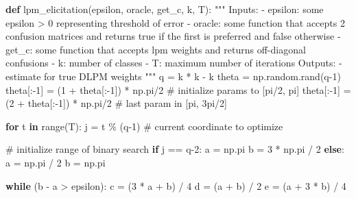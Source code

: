 \documentclass[
  letterpaper,
  numbers=noenddot,
  DIV=11,
  oneside]{scrreprt}
\newenvironment{Shaded}{\begin{snugshade}}{\end{snugshade}}
\newcommand{\BuiltInTok}[1]{\textcolor[rgb]{0.00,0.23,0.31}{#1}}
\newcommand{\CommentTok}[1]{\textcolor[rgb]{0.37,0.37,0.37}{#1}}
\newcommand{\ControlFlowTok}[1]{\textcolor[rgb]{0.00,0.23,0.31}{\textbf{#1}}}
\newcommand{\DecValTok}[1]{\textcolor[rgb]{0.68,0.00,0.00}{#1}}
\newcommand{\KeywordTok}[1]{\textcolor[rgb]{0.00,0.23,0.31}{\textbf{#1}}}
\newcommand{\NormalTok}[1]{\textcolor[rgb]{0.00,0.23,0.31}{#1}}
\newcommand{\OperatorTok}[1]{\textcolor[rgb]{0.37,0.37,0.37}{#1}}
\theoremstyle{remark}
\begin{document}
\begin{Shaded}
\begin{Highlighting}[numbers=left,,]
\KeywordTok{def}\NormalTok{ lpm\_elicitation(epsilon, oracle, get\_c, k, T):}
    \CommentTok{"""}
\CommentTok{    Inputs:}
\CommentTok{    {-} epsilon: some epsilon \textgreater{} 0 representing threshold of error}
\CommentTok{    {-} oracle: some function that accepts 2 confusion matrices and}
\CommentTok{        returns true if the first is preferred and false otherwise}
\CommentTok{    {-} get\_c: some function that accepts lpm weights and returns }
\CommentTok{        off{-}diagonal confusions}
\CommentTok{    {-} k: number of classes}
\CommentTok{    {-} T: maximum number of iterations}
\CommentTok{    Outputs:}
\CommentTok{    {-} estimate for true DLPM weights}
\CommentTok{    """}
\NormalTok{    q }\OperatorTok{=}\NormalTok{ k }\OperatorTok{*}\NormalTok{ k }\OperatorTok{{-}}\NormalTok{ k}
\NormalTok{    theta }\OperatorTok{=}\NormalTok{ np.random.rand(q}\OperatorTok{{-}}\DecValTok{1}\NormalTok{)}
\NormalTok{    theta[:}\OperatorTok{{-}}\DecValTok{1}\NormalTok{] }\OperatorTok{=}\NormalTok{ (}\DecValTok{1} \OperatorTok{+}\NormalTok{ theta[:}\OperatorTok{{-}}\DecValTok{1}\NormalTok{]) }\OperatorTok{*}\NormalTok{ np.pi}\OperatorTok{/}\DecValTok{2}  \CommentTok{\# initialize params to [pi/2, pi]}
\NormalTok{    theta[:}\OperatorTok{{-}}\DecValTok{1}\NormalTok{] }\OperatorTok{=}\NormalTok{ (}\DecValTok{2} \OperatorTok{+}\NormalTok{ theta[:}\OperatorTok{{-}}\DecValTok{1}\NormalTok{]) }\OperatorTok{*}\NormalTok{ np.pi}\OperatorTok{/}\DecValTok{2}  \CommentTok{\# last param in [pi, 3pi/2]}

    \ControlFlowTok{for}\NormalTok{ t }\KeywordTok{in} \BuiltInTok{range}\NormalTok{(T):}
\NormalTok{        j }\OperatorTok{=}\NormalTok{ t }\OperatorTok{\%}\NormalTok{ (q}\OperatorTok{{-}}\DecValTok{1}\NormalTok{)  }\CommentTok{\# current coordinate to optimize}

        \CommentTok{\# initialize range of binary search}
        \ControlFlowTok{if}\NormalTok{ j }\OperatorTok{==}\NormalTok{ q}\OperatorTok{{-}}\DecValTok{2}\NormalTok{:}
\NormalTok{            a }\OperatorTok{=}\NormalTok{ np.pi}
\NormalTok{            b }\OperatorTok{=} \DecValTok{3} \OperatorTok{*}\NormalTok{ np.pi }\OperatorTok{/} \DecValTok{2}
        \ControlFlowTok{else}\NormalTok{:}
\NormalTok{            a }\OperatorTok{=}\NormalTok{ np.pi }\OperatorTok{/} \DecValTok{2}
\NormalTok{            b }\OperatorTok{=}\NormalTok{ np.pi}
        
        \ControlFlowTok{while}\NormalTok{ (b }\OperatorTok{{-}}\NormalTok{ a }\OperatorTok{\textgreater{}}\NormalTok{ epsilon):}
\NormalTok{            c }\OperatorTok{=}\NormalTok{ (}\DecValTok{3} \OperatorTok{*}\NormalTok{ a }\OperatorTok{+}\NormalTok{ b) }\OperatorTok{/} \DecValTok{4}
\NormalTok{            d }\OperatorTok{=}\NormalTok{ (a }\OperatorTok{+}\NormalTok{ b) }\OperatorTok{/} \DecValTok{2}
\NormalTok{            e }\OperatorTok{=}\NormalTok{ (a }\OperatorTok{+} \DecValTok{3} \OperatorTok{*}\NormalTok{ b) }\OperatorTok{/} \DecValTok{4}


\end{Highlighting}
\end{Shaded}
\end{document}
